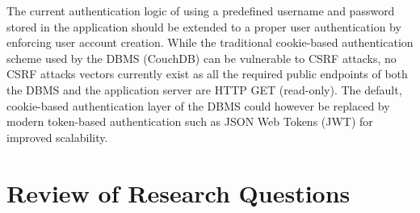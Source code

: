 \documentclass[thesis.tex]{subfiles}
\begin{document}
The current authentication logic of using a predefined username and password stored in the application should be extended to a proper user authentication by enforcing user account creation. While the traditional cookie-based authentication scheme used by the DBMS (CouchDB) can be vulnerable to CSRF attacks, no CSRF attacks vectors currently exist as all the required public endpoints of both the DBMS and the application server are HTTP GET (read-only). The default, cookie-based authentication layer of the DBMS could however be replaced by modern token-based authentication such as JSON Web Tokens (JWT) for improved scalability.

\section{Review of Research Questions}
\end{document}
